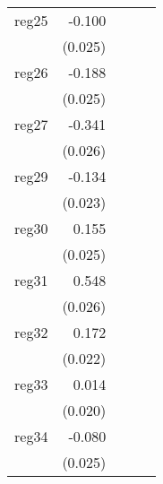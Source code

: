 {\begin{longtable}{l*{4}{D{.}{.}{-1}}}
\addlinespace
reg25       &      -0.100\sym{***}&                     &                     &                     \\
            &     (0.025)         &                     &                     &                     \\
\addlinespace
reg26       &      -0.188\sym{***}&                     &                     &                     \\
            &     (0.025)         &                     &                     &                     \\
\addlinespace
reg27       &      -0.341\sym{***}&                     &                     &                     \\
            &     (0.026)         &                     &                     &                     \\
\addlinespace
reg29       &      -0.134\sym{***}&                     &                     &                     \\
            &     (0.023)         &                     &                     &                     \\
\addlinespace
reg30       &       0.155\sym{***}&                     &                     &                     \\
            &     (0.025)         &                     &                     &                     \\
\addlinespace
reg31       &       0.548\sym{***}&                     &                     &                     \\
            &     (0.026)         &                     &                     &                     \\
\addlinespace
reg32       &       0.172\sym{***}&                     &                     &                     \\
            &     (0.022)         &                     &                     &                     \\
\addlinespace
reg33       &       0.014         &                     &                     &                     \\
            &     (0.020)         &                     &                     &                     \\
\addlinespace
reg34       &      -0.080\sym{**} &                     &                     &                     \\
            &     (0.025)         &                     &                     &                     \\

\end{longtable}}
